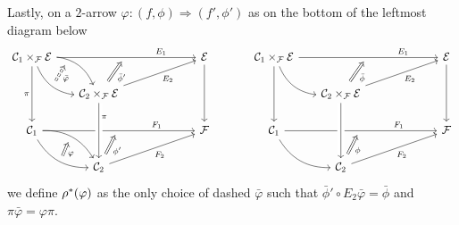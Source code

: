 \documentclass[a4paper,10pt
,draft
]{article}%
\numberwithin{equation}{section}
\numberwithin{figure}{section}
\theoremstyle{definition} %
\newcommand{\1}{\ensuremath{\mathbbm 1}}%
\begin{document}



Lastly, on a $2$-arrow $\varphi \colon (f,\phi) \Rightarrow (f',\phi')$
as on the bottom of the leftmost diagram below
\begin{equation}\label{PULL2ARR EQ}
\begin{tikzcd}[column sep = 16pt, row sep = 17pt]
	\mathcal{C}_1 \times_{\mathcal{F}} \mathcal{E} 
	\ar{rrrrr}[name=toE]{}[near end]{E_1} 
	\ar[bend left]{rd}[near start,swap,name=FE]{}
	\ar[bend right]{rd}[name=FFE]{} \ar{dd}[swap]{\pi}
	&&&
	&&
	\mathcal{E}  \ar{dd}
&&
	\mathcal{C}_1 \times_{\mathcal{F}} \mathcal{E} 
	\ar{rrrrr}[name=toE2]{}[near end]{E_1} 
	\ar[bend right]{rd}{} \ar{dd}
	&&&
	&&
	\mathcal{E}  \ar{dd}
\\
	&
	|[alias=DBE]|
	\mathcal{C}_2 \times_{\mathcal{F}} \mathcal{E} \ar{rrrru}[swap]{E_2} &&&&
&&
	&
	|[alias=DBE2]|
	\mathcal{C}_2 \times_{\mathcal{F}} \mathcal{E} \ar{rrrru}[swap]{E_2} &&&&
\\
	\mathcal{C}_1 \ar{rrrrr}[name=toB]{}[near end]{F_1} 
	\ar[bend left]{rd}[swap,name=FF]{}
	\ar[bend right]{rd} [name=F]{}
	&&&
	&&
	\mathcal{F} 
&&
	\mathcal{C}_1 \ar{rrrrr}[name=toB2]{}[near end]{F_1} 
	\ar[bend right]{rd}{}
	&&&
	&&
	\mathcal{F} 
\\
	&
	|[alias=D]| \mathcal{C}_2 \ar{rrrru}[swap]{F_2} &&&&
&&
	&
	|[alias=D2]|
	\mathcal{C}_2 \ar{rrrru}[swap]{F_2} &&&&
\arrow[Rightarrow, from=DBE, to=toE, shorten <=0.15cm,shorten >=0.15cm
,swap,"\bar{\phi}'"
]
\arrow[Rightarrow, from=DBE2, to=toE2, shorten <=0.15cm,shorten >=0.15cm
,swap,"\bar{\phi}"
]
\arrow[Rightarrow, from=D, to=toB, shorten <=0.15cm,shorten >=0.15cm,swap,"\phi'"]
\arrow[Rightarrow, from=D2, to=toB2, shorten <=0.15cm,shorten >=0.15cm,swap,"\phi"]
\arrow[Rightarrow, from=F, to=FF, shorten <=0cm,shorten >=0cm,swap,"\varphi"]
\arrow[Rightarrow, from=FFE, to=FE, shorten <=0cm,shorten >=0cm,swap,dashed,"\bar{\varphi}"]
\arrow[from=DBE, to=D, crossing over,near start,"\pi"]
\arrow[from=DBE2, to=D2, crossing over]
\end{tikzcd}
\end{equation}
we define $\rho^{\**}(\varphi)$
as the only choice of dashed $\bar{\varphi}$
such that $\bar{\phi}' \circ E_2\bar{\varphi} = \bar{\phi}$
and $\pi \bar{\varphi} = \varphi \pi$.

\end{document}

